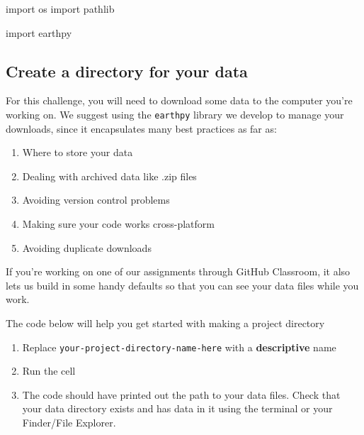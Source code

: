 \documentclass[
  letterpaper,
  DIV=11,
  numbers=noendperiod,
  oneside]{scrreprt}
\newenvironment{Shaded}{\begin{snugshade}}{\end{snugshade}}
\newcommand{\ImportTok}[1]{\textcolor[rgb]{0.00,0.46,0.62}{#1}}
\newcommand{\NormalTok}[1]{\textcolor[rgb]{0.00,0.23,0.31}{#1}}
\providecommand{\tightlist}{%
  \setlength{\itemsep}{0pt}\setlength{\parskip}{0pt}}
\begin{document}
\begin{Shaded}
\begin{Highlighting}[]
\ImportTok{import}\NormalTok{ os}
\ImportTok{import}\NormalTok{ pathlib}

\ImportTok{import}\NormalTok{ earthpy}
\end{Highlighting}
\end{Shaded}

\subsection{Create a directory for your
data}\label{create-a-directory-for-your-data}

For this challenge, you will need to download some data to the computer
you're working on. We suggest using the \texttt{earthpy} library we
develop to manage your downloads, since it encapsulates many best
practices as far as:

\begin{enumerate}
\def\labelenumi{\arabic{enumi}.}
\tightlist
\item
  Where to store your data
\item
  Dealing with archived data like .zip files
\item
  Avoiding version control problems
\item
  Making sure your code works cross-platform
\item
  Avoiding duplicate downloads
\end{enumerate}

If you're working on one of our assignments through GitHub Classroom, it
also lets us build in some handy defaults so that you can see your data
files while you work.

\begin{tcolorbox}[enhanced jigsaw, colbacktitle=quarto-callout-color!10!white, opacityback=0, bottomtitle=1mm, toptitle=1mm, bottomrule=.15mm, left=2mm, colframe=quarto-callout-color-frame, leftrule=.75mm, opacitybacktitle=0.6, colback=white, rightrule=.15mm, toprule=.15mm, breakable, titlerule=0mm, title=\textcolor{quarto-callout-color}{\faInfo}\hspace{0.5em}{Try It: Create a project folder}, coltitle=black, arc=.35mm]

The code below will help you get started with making a project directory

\begin{enumerate}
\def\labelenumi{\arabic{enumi}.}
\tightlist
\item
  Replace
  \texttt{\textquotesingle{}your-project-directory-name-here\textquotesingle{}}
  with a \textbf{descriptive} name
\item
  Run the cell
\item
  The code should have printed out the path to your data files. Check
  that your data directory exists and has data in it using the terminal
  or your Finder/File Explorer.
\end{enumerate}

\end{tcolorbox}
\end{document}
